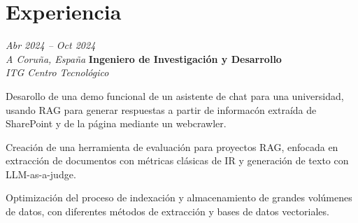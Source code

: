 \section{Experiencia}

\begin{twocolentry}{
    \textit{Abr 2024 – Oct 2024} \\
    \textit{A Coruña, España}}  
    \textbf{Ingeniero de Investigación y Desarrollo} \\
    \textit{ITG Centro Tecnológico}
\end{twocolentry}

\vspace{0.20 cm}
\begin{onecolentry}
    \begin{highlights}
        \item Desarollo de una demo funcional de un asistente de chat para una universidad, usando RAG para generar respuestas a partir de informacón extraída de SharePoint y de la página mediante un webcrawler.
        \item Creación de una herramienta de evaluación para proyectos RAG, enfocada en extracción de documentos con métricas clásicas de IR y generación de texto con LLM-as-a-judge.
        \item Optimización del proceso de indexación y almacenamiento de grandes volúmenes de datos, con diferentes métodos de extracción y bases de datos vectoriales.
    \end{highlights}
\end{onecolentry}